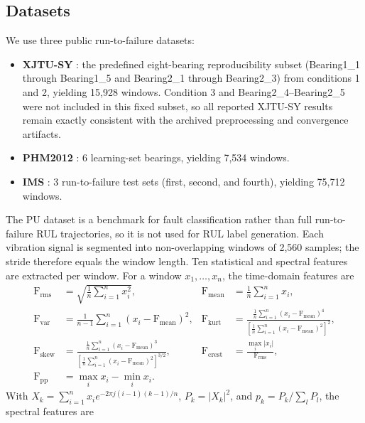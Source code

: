 \documentclass[pdflatex,sn-basic,NameDate]{sn-jnl}
\begin{document}
\subsection{Datasets}
We use three public run-to-failure datasets:
\begin{itemize}
    \item \textbf{XJTU-SY} \citep{xjtusy2019dataset}: the predefined eight-bearing reproducibility subset (Bearing1\_1 through Bearing1\_5 and Bearing2\_1 through Bearing2\_3) from conditions 1 and 2, yielding 15,928 windows. Condition 3 and Bearing2\_4--Bearing2\_5 were not included in this fixed subset, so all reported XJTU-SY results remain exactly consistent with the archived preprocessing and convergence artifacts.
    \item \textbf{PHM2012} \citep{nectoux2012pronostia}: 6 learning-set bearings, yielding 7,534 windows.
    \item \textbf{IMS} \citep{ims2006}: 3 run-to-failure test sets (first, second, and fourth), yielding 75,712 windows.
\end{itemize}
The PU dataset is a benchmark for fault classification rather than full run-to-failure RUL trajectories, so it is not used for RUL label generation. Each vibration signal is segmented into non-overlapping windows of 2,560 samples; the stride therefore equals the window length. Ten statistical and spectral features are extracted per window. For a window $x_1,\dots,x_n$, the time-domain features are
\begin{align}
\mathrm{F}_{\mathrm{rms}} &= \sqrt{\frac{1}{n}\sum_{i=1}^{n}x_i^2}, &
\mathrm{F}_{\mathrm{mean}} &= \frac{1}{n}\sum_{i=1}^{n}x_i, \nonumber \\
\mathrm{F}_{\mathrm{var}} &= \frac{1}{n-1}\sum_{i=1}^{n}(x_i-\mathrm{F}_{\mathrm{mean}})^2, &
\mathrm{F}_{\mathrm{kurt}} &= \frac{\frac{1}{n}\sum_{i=1}^{n}(x_i-\mathrm{F}_{\mathrm{mean}})^4}{\left[\frac{1}{n}\sum_{i=1}^{n}(x_i-\mathrm{F}_{\mathrm{mean}})^2\right]^2}, \nonumber \\
\mathrm{F}_{\mathrm{skew}} &= \frac{\frac{1}{n}\sum_{i=1}^{n}(x_i-\mathrm{F}_{\mathrm{mean}})^3}{\left[\frac{1}{n}\sum_{i=1}^{n}(x_i-\mathrm{F}_{\mathrm{mean}})^2\right]^{3/2}}, &
\mathrm{F}_{\mathrm{crest}} &= \frac{\max_i |x_i|}{\mathrm{F}_{\mathrm{rms}}}, \nonumber \\
\mathrm{F}_{\mathrm{pp}} &= \max_i x_i - \min_i x_i. \nonumber
\end{align}
With $X_k=\sum_{i=1}^{n}x_i e^{-2\pi j (i-1)(k-1)/n}$, $P_k=|X_k|^2$, and $p_k=P_k/\sum_l P_l$, the spectral features are
\end{document}

